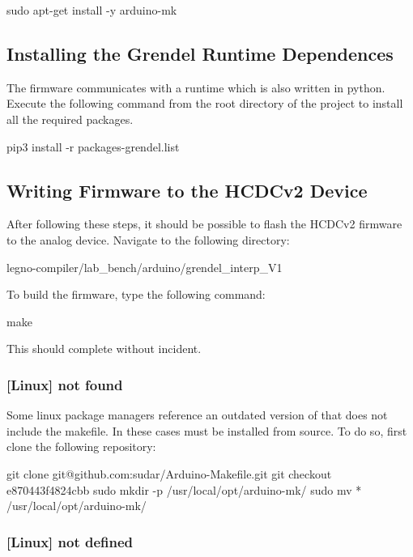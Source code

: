 \begin{snippet}
sudo apt-get install -y arduino-mk
\end{snippet}

\subsection{Installing the Grendel Runtime Dependences}


The firmware communicates with a runtime which is also written in python.
Execute the following command from the root directory of the 
project to install all the required packages.

\begin{snippet}
  pip3 install -r packages-grendel.list
\end{snippet}

\subsection{Writing Firmware to the HCDCv2 Device}
After following these steps, it should be possible to flash the HCDCv2
firmware to the analog device. Navigate to the following directory:

\begin{snippet}
  legno-compiler/lab_bench/arduino/grendel_interp_V1
\end{snippet}

To build the firmware, type the following command:
\begin{snippet}
  make
\end{snippet}

This should complete without incident. 


\subsubsection{[Linux]  not found}

Some linux package managers reference an outdated version of 
that does not include the  makefile. In these cases 
must be installed from source. To do so, first clone the following repository:

\begin{snippet}
git clone git@github.com:sudar/Arduino-Makefile.git
git checkout e870443f4824cbb
sudo mkdir -p /usr/local/opt/arduino-mk/
sudo mv * /usr/local/opt/arduino-mk/
\end{snippet}

\subsubsection{[Linux]  not defined}

